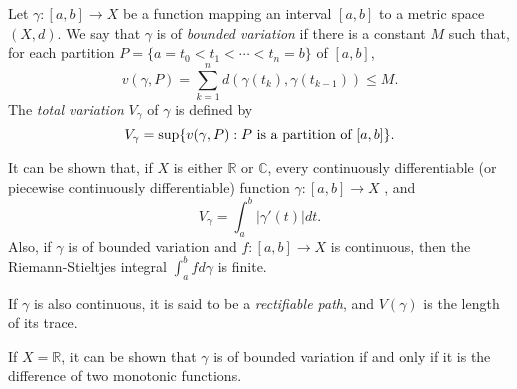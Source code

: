 \documentclass[12pt]{article}
\begin{document}
Let $\gamma:[a,b]\rightarrow X$ be a function mapping an interval $[a,b]$ to a metric space $(X,d)$. We say that $\gamma$ is of \emph{bounded variation} if there is a constant $M$ such that, for each partition 
$P=\{a=t_0<t_1<\cdots < t_n=b\}$ of $[a,b]$,
\[ v(\gamma, P)= \sum_{k=1}^n d(\gamma(t_k),\gamma(t_{k-1})) \leq M. \]
The \emph{total variation} $V_\gamma$ of $\gamma$ is defined by 
\[V_\gamma = \sup\{v(\gamma,P):\textnormal{$P$ is a partition of $[a,b]$}\}.\]

It can be shown that, if $X$ is either $\mathbb{R}$ or $\mathbb{C}$, every continuously differentiable (or piecewise continuously differentiable) function $\gamma:[a,b]\rightarrow X$ , and \[V_\gamma = \int_a^b |\gamma'(t)|dt.\]
Also, if $\gamma$ is of bounded variation and $f:[a,b]\rightarrow X$ is continuous, then the Riemann-Stieltjes integral $\int_a^b fd\gamma$ is finite.

If $\gamma$ is also continuous, it is said to be a \emph{rectifiable path}, and $V(\gamma)$ is the length of its trace.

If $X=\mathbb{R}$, it can be shown that $\gamma$ is of bounded variation if and only if it is the difference of two monotonic functions.
\end{document}
